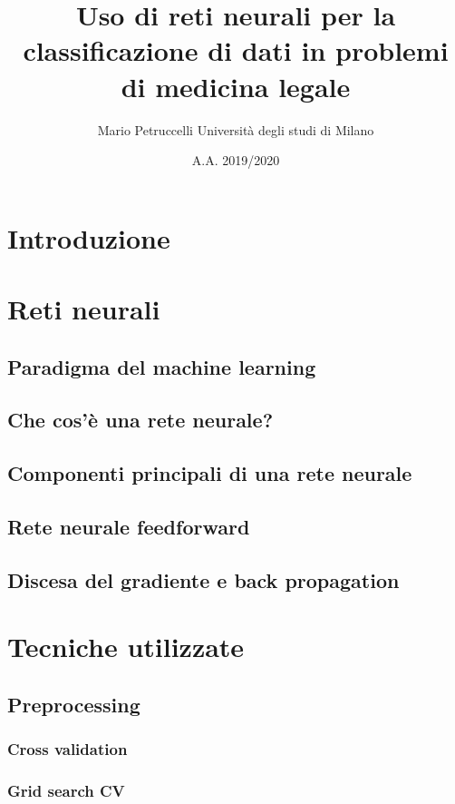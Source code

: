\documentclass[12pt, twoside, letterpaper]{article}
\title{Uso di reti neurali per la classificazione di dati in problemi di medicina legale}
\author{Mario Petruccelli \cr Università degli studi di Milano}
\date{A.A. 2019/2020}
\begin{document}
	\begin{titlepage}
		\maketitle
		\newpage
		\tableofcontents
	\end{titlepage}

	\section*{Introduzione}

	\section{Reti neurali}
		\subsection{Paradigma del machine learning}
		\subsection{Che cos'è una rete neurale?}
		\subsection{Componenti principali di una rete neurale}
		\subsection{Rete neurale feedforward}
		\subsection{Discesa del gradiente e back propagation}
		
	\section{Tecniche utilizzate}
		\subsection{Preprocessing}
			\subsubsection{Cross validation}
			\subsubsection{Grid search CV}
\end{document}
